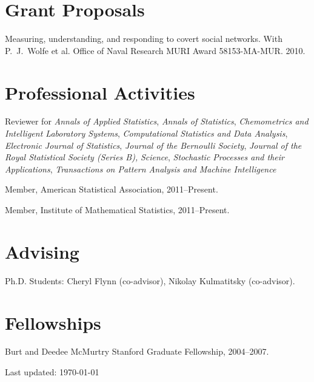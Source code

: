 \documentclass[10pt,letterpaper]{article}
\renewenvironment{itemize}{
  \begin{list}{}{
    \setlength{\leftmargin}{1.5em}
    \setlength{\itemsep}{0.25em}
    \setlength{\parskip}{0pt}
    \setlength{\parsep}{0.25em}
  }
}{
  \end{list}
}
\begin{document}
\section*{Grant Proposals}
\begin{itemize}
  \item Measuring, understanding, and responding to covert social networks.
  With P.~J.~Wolfe et al.
  Office of Naval Research MURI Award 58153-MA-MUR.
  2010.
\end{itemize}


\section*{Professional Activities}

\begin{itemize}
\item Reviewer for
  \textit{Annals of Applied Statistics},
  \textit{Annals of Statistics},
  \textit{Chemometrics and Intelligent Laboratory Systems},
  \textit{Computational Statistics and Data Analysis},
  \textit{Electronic Journal of Statistics},
  \textit{Journal of the Bernoulli Society},
  \textit{Journal of the Royal Statistical Society (Series B),}
  \textit{Science},
  \textit{Stochastic Processes and their Applications},
  \textit{Transactions on Pattern Analysis and Machine Intelligence}
\item Member, American Statistical Association, 2011--Present.
\item Member, Institute of Mathematical Statistics, 2011--Present.
\end{itemize}

\section*{Advising}

\begin{itemize}
\item Ph.D. Students: Cheryl Flynn (co-advisor), Nikolay Kulmatitsky (co-advisor).
\end{itemize}

\section*{Fellowships}

\begin{itemize}
\item Burt and Deedee McMurtry Stanford Graduate Fellowship, 2004--2007.
\end{itemize}

\medskip

\begin{center}
  \begin{small}
    Last updated: \today
  \end{small}
\end{center}
\end{document}
